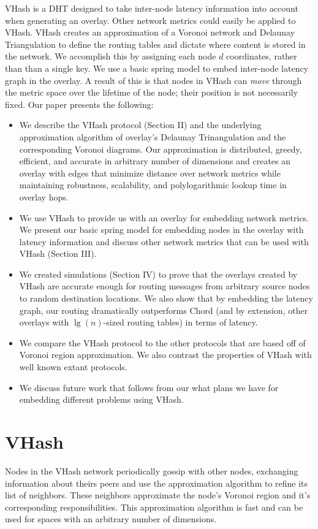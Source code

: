 \documentclass{IEEEtran}
\begin{document}
VHash is a DHT designed to take inter-node latency information into account when generating an overlay.
Other network metrics could easily be applied to VHash.
VHash creates an approximation of a Voronoi network and Delaunay Triangulation to define the routing tables and dictate where content is stored in the network.
We accomplish this by assigning each node $d$ coordinates, rather than than a single key.
We use a basic spring model to embed inter-node latency graph in the overlay.
A result of this is that nodes in VHash  can \emph{move} through the metric space over the lifetime of the node;  their position is not necessarily fixed.
Our paper presents the following:

\begin{itemize}
	\item We describe the VHash protocol (Section II) and the underlying approximation algorithm of overlay's Delaunay Trinangulation and the corresponding Voronoi diagrams.
    Our approximation is distributed, greedy, efficient, and accurate in arbitrary number of dimensions and creates an overlay with edges that minimize distance over network metrics while maintaining robustness, scalability, and polylogarithmic lookup time in overlay hops.
	\item We use VHash to provide us with an overlay for embedding network metrics.
    We present our basic spring model for embedding nodes in the overlay with latency information and discuss other network metrics that can be used with VHash (Section III).
	\item We created simulations (Section IV) to prove that the overlays created by VHash are accurate enough for routing messages from arbitrary source nodes to random destination locations.
    We also show that by embedding the latency graph, our routing dramatically outperforms Chord (and by extension, other overlays with $\lg(n)$-sized routing tables) in terms of latency.
	\item We compare the VHash protocol to the other protocols that are based off of Voronoi region approximation.  We also contrast the properties of VHash with well known extant protocols.
	\item We discuss future work that follows from our what plans we have for embedding different problems using VHash.
\end{itemize}


\section{VHash}
Nodes in the VHash network periodically gossip with other nodes, exchanging information about theirs peers and use the approximation algorithm to refine its list of neighbors.
These neighbors approximate the node's Voronoi region and it's corresponding responsibilities.
This approximation algorithm is fast and can be used for spaces with an arbitrary number of dimensions.
\end{document}

